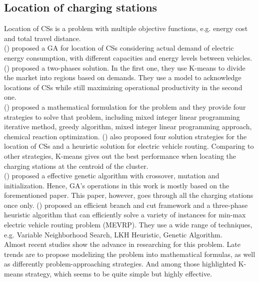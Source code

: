 \documentclass[conference,compsoc]{IEEEtran}
\begin{document}
\subsection{Location of charging stations}
Location of CSs is a problem with multiple objective functions, e.g. energy cost and total travel distance.\\

\citeauthor{locationCS} (\citeyear{locationCS}) \cite{locationCS} proposed a GA for location of CSs considering actual demand of electric energy consumption, with different capacities and energy levels between vehicles. \citeauthor{locationCS2} (\citeyear{locationCS2}) \cite{locationCS2} proposed a two-phases solution. In the first one, they use K-means \cite{k-means} to divide the market into regions based on demands. They use a model to acknowledge locations of CSs while still maximizing operational productivity in the second one.\\

\citeauthor{locationCS3} (\citeyear{locationCS3}) \cite{locationCS3} proposed a mathematical formulation for the problem and they provide four strategies to solve that problem, including mixed integer linear programming iterative method, greedy algorithm, mixed integer linear programming approach, chemical reaction optimization. \citeauthor{locationCS4} (\citeyear{locationCS4}) \cite{locationCS4} also proposed four solution strategies for the location of CSs and a heuristic solution for electric vehicle routing. Comparing to other strategies, K-means gives out the best performance when locating the charging stations at the centroid of the cluster.\\

\citeauthor{locationCS5} (\citeyear{locationCS5}) \cite{locationCS5} proposed a effective genetic algorithm with crossover, mutation and initialization. Hence, GA's operations in this work is mostly based on the forementioned paper. This paper, however, goes through all the charging stations once only. \citeauthor{locationCS6} (\citeyear{locationCS6}) \cite{locationCS6} proposed an efficient branch and cut framework and a three-phase heuristic algorithm that can efficiently solve a variety of instances for min-max electric vehicle routing problem (MEVRP). They use a wide range of techniques, e.g. Variable Neighborhood Search, LKH Heuristic, Genetic Algorithm.\\

Almost recent studies show the advance in researching for this problem. Late trends are to propose modelizing the problem into mathematical formulas, as well as differently problem-approaching strategies. And among those highlighted K-means strategy, which seems to be quite simple but highly effective.
\end{document}
